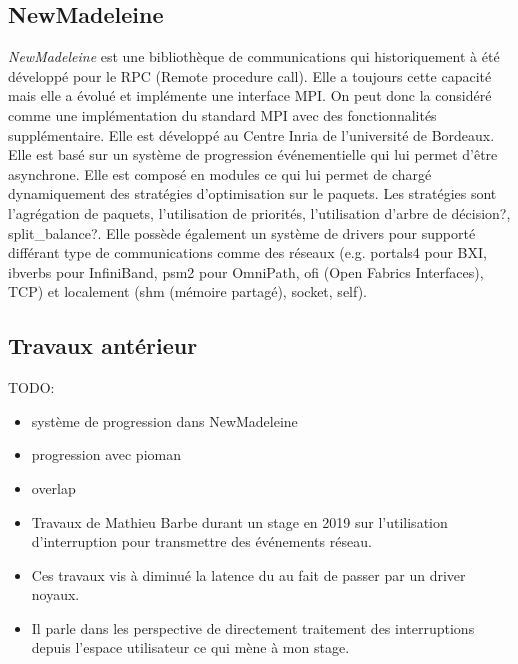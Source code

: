\subsection{NewMadeleine}

\emph{NewMadeleine} est une bibliothèque de communications qui historiquement à été développé pour le RPC (Remote procedure call).
Elle a toujours cette capacité mais elle a évolué et implémente une interface MPI.
On peut donc la considéré comme une implémentation du standard MPI avec des fonctionnalités supplémentaire.
Elle est développé au Centre Inria de l'université de Bordeaux.
Elle est basé sur un système de progression événementielle qui lui permet d'être asynchrone.
Elle est composé en modules ce qui lui permet de chargé dynamiquement des stratégies d'optimisation sur le paquets.
Les stratégies sont l'agrégation de paquets, l'utilisation de priorités, l'utilisation d'arbre de décision?, split_balance?.
Elle possède également un système de drivers pour supporté différant type de communications comme des réseaux
(e.g. portals4 pour BXI, ibverbs pour InfiniBand, psm2 pour OmniPath, ofi (Open Fabrics Interfaces), TCP) %
et localement (shm (mémoire partagé), socket, self).

\subsection{Travaux antérieur}

TODO:

\begin{itemize}
  \item système de progression dans NewMadeleine
  \item progression avec pioman
  \item overlap
  \item Travaux de Mathieu Barbe durant un stage en 2019 sur l'utilisation d'interruption pour transmettre des événements réseau.
  \item Ces travaux vis à diminué la latence du au fait de passer par un driver noyaux.
  \item Il parle dans les perspective de directement traitement des interruptions depuis l'espace utilisateur ce qui mène à mon stage.
\end{itemize}


